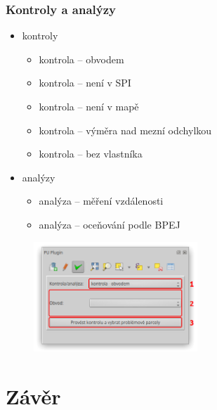\documentclass{beamer}
\begin{document}
\begin{frame}

\frametitle{Kontroly a analýzy}


\begin{itemize}
	\item kontroly
	\begin{itemize}
		\item kontrola – obvodem
		\item kontrola – není v SPI
		\item kontrola – není v mapě
		\item kontrola – výměra nad mezní odchylkou
		\item kontrola – bez vlastníka
	\end{itemize}
	\item analýzy
	\begin{itemize}
		\item analýza – měření vzdálenosti
		\item analýza – oceňování podle BPEJ
	\end{itemize}
\end{itemize}

\begin{figure}[ht]
	\includegraphics[width=0.55\textwidth]{pictures/ca_gui.png}
\end{figure}

\end{frame}


\section{Závěr}
\end{document}

